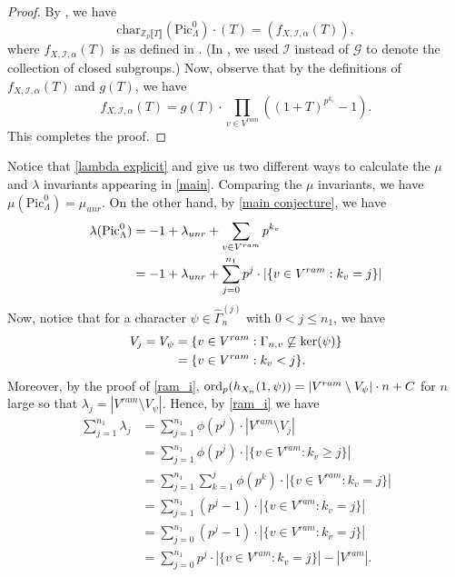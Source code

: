 \documentclass[11pt]{amsart}
\numberwithin{equation}{section}
\theoremstyle{remark}
\theoremstyle{definition}
\begin{document}
\begin{proof}
By \cite[Theorem 6.1]{Gambheera/Vallieres:2024}, we have 
$$\mathrm{char}_{\mathbb{Z}_{p}\llbracket T \rrbracket}(\mathrm{Pic}_{\Lambda}^{0}) \cdot (T) = (f_{X,\mathcal{I},\alpha}(T)), $$ where $f_{X,\mathcal{I},\alpha}(T)$ is as defined in \cite[(6.2)]{Gambheera/Vallieres:2024}.  (In \cite{Gambheera/Vallieres:2024}, we used $\mathcal{I}$ instead of $\mathcal{G}$ to denote the collection of closed subgroups.)  Now, observe that by the definitions of $f_{X,\mathcal{I},\alpha}(T)$ and $g(T)$, we have
$$f_{X,\mathcal{I},\alpha}(T)= g(T)\cdot \prod_{v\in V^{ram}} ((1+T)^{p^{k_v}}-1).$$
This completes the proof.
\end{proof}

Notice that \cref{lambda explicit} and \cite[Theorem 5.6]{Gambheera/Vallieres:2024} give us two different ways to calculate the $\mu$ and $\lambda$ invariants appearing in \cref{main}.  Comparing the $\mu$ invariants, we have $\mu(\mathrm{Pic}_{\Lambda}^{0})=\mu_{unr}$. On the other hand, by \cref{main conjecture}, we have
\begin{equation}\label{lambda-algebraic}
\begin{aligned}
\lambda({\rm Pic}^0_{\Lambda}) &= -1 +\lambda_{unr}+ \sum_{v\in V^{ram}} p^{k_v}\\
&= -1 + \lambda_{unr}+ \sum_{j=0}^{n_1} p^j \cdot |\{v\in V^{ram}: k_v=j\}|
\end{aligned}
\end{equation}
Now, notice that for a character  $\psi \in \widehat{\Gamma}_{n}^{(j)}$ with $0<j\leq n_{1}$, we have
\begin{equation*} 
\begin{aligned}
V_{j} = V_{\psi} &= \{v\in V^{ram}: \Gamma_{n,v} \not\subseteq {\rm ker}(\psi)\}\\
&= \{v\in V^{ram}: k_v <j\}.
\end{aligned}
\end{equation*}
Moreover, by the proof of \cref{ram_i}, ${\rm ord}_{p}(h_{X_n}(1,\psi))=|V^{ram}\setminus V_{\psi}| \cdot n + C$ for $n$ large so that $\lambda_{j} = |V^{ram}\setminus V_{\psi}|$.  Hence, by \cref{ram_i} we have
\begin{equation}\label{lambda-analytic}
\begin{aligned}
\sum_{j=1}^{n_1} \lambda_j &=\sum_{j=1}^{n_1} \phi(p^j)\cdot |V^{ram}\setminus V_{j}| \\
&=\sum_{j=1}^{n_1} \phi(p^j)\cdot |\{v\in V^{ram} : k_v\geq j\}| \\
&= \sum_{j=1}^{n_1} \sum_{k=1}^j \phi(p^k) \cdot |\{v\in V^{ram} : k_v=j\}| \\
&=  \sum_{j=1}^{n_1} (p^j-1) \cdot |\{v\in V^{ram} : k_v=j\}| \\
&=  \sum_{j=0}^{n_1} (p^j-1) \cdot |\{v\in V^{ram} : k_v=j\}| \\
&= \sum_{j=0}^{n_1} p^j \cdot |\{v\in V^{ram} : k_v=j\}| -|V^{ram}|.
\end{aligned}
\end{equation}
\end{document}
